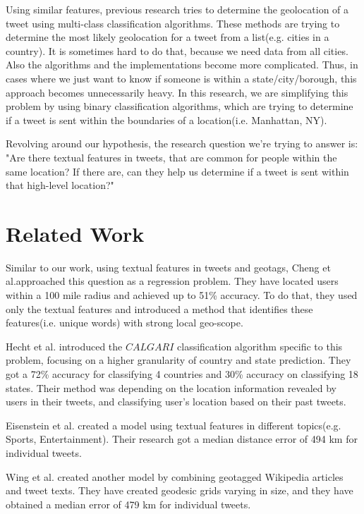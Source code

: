 \documentclass[twoside,11pt]{article}
\begin{document}
Using similar features, previous research tries to determine the geolocation of a tweet using multi-class classification algorithms. These methods are trying to determine the most likely geolocation for a tweet from a list(e.g. cities in a country). It is sometimes hard to do that, because we need data from all cities. Also the algorithms and the implementations become more complicated. Thus, in cases where we just want to know if someone is within a state/city/borough, this approach becomes unnecessarily heavy. In this research, we are simplifying this problem by using binary classification algorithms, which are trying to determine if a tweet is sent within the boundaries of a location(i.e. Manhattan, NY). 

Revolving around our hypothesis, the research question we're trying to answer is: "Are there textual features in tweets, that are common for people within the same location? If there are, can they help us determine if a tweet is sent within that high-level location?"

\section{Related Work}

Similar to our work, using textual features in tweets and geotags, Cheng et al.approached this question as a regression problem\cite{cheng2010you}. They have located users within a 100 mile radius and achieved up to 51\% accuracy. To do that, they used only the textual features and introduced a method that identifies these features(i.e. unique words) with strong local geo-scope.

Hecht et al. introduced the $CALGARI$ classification algorithm specific to this problem, focusing on a higher granularity of country and state prediction\cite{hecht2011tweets}. They got a 72\% accuracy for classifying 4 countries and 30\% accuracy on classifying 18 states. Their method was depending on the location information revealed by users in their tweets, and classifying user's location based on their past tweets.

Eisenstein et al. created a model using textual features in different topics(e.g. Sports, Entertainment)\cite{eisenstein2010latent}. Their research got a median distance error of 494 km for individual tweets.

Wing et al. created another model by combining geotagged Wikipedia articles and tweet texts\cite{wing2011simple}. They have created geodesic grids varying in size, and they have obtained a median error of 479 km for individual tweets. 
\end{document}
